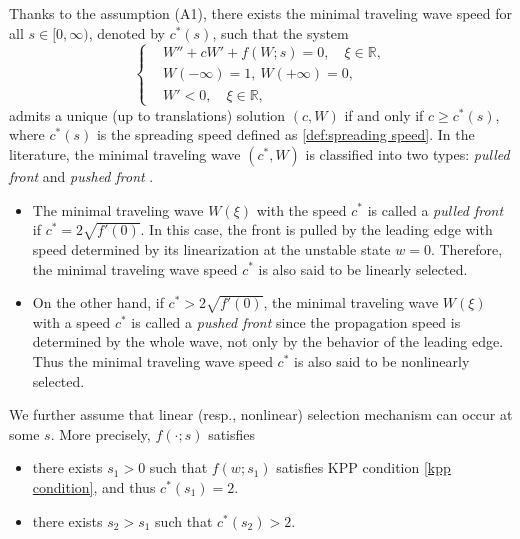 \documentclass[11pt,a4paper]{article}
\numberwithin{equation}{section}
\numberwithin{figure}{section}
\begin{document}
Thanks to the assumption  (A1), there exists the minimal traveling wave speed for all $s\in[0,\infty)$, denoted by $c^*(s)$, such that
the system
\begin{equation}\label{scalar tw-parameter s}
\left\{
\begin{aligned}
&W''+cW'+f(W;s)=0,\quad  \xi\in\mathbb{R},\\
&W(-\infty)=1,\ W(+\infty)=0,\\
&W'<0,\quad \xi\in\mathbb{R},
\end{aligned}
\right.
\end{equation}
admits a unique (up to translations) solution $(c,W)$ if and only if  $c\geq c^*(s)$, where $c^*(s)$ is the spreading speed defined as \eqref{def:spreading speed}. 
In the literature, the minimal traveling wave $(c^*,W)$ is classified into two types: {\em pulled front} and
{\em pushed front} \cite{Rothe1981,Stokes1976,van Saarloos2003}.
\begin{itemize}
    \item The minimal traveling wave $W(\xi)$ with the speed $c^*$ is called a {\em pulled front} if $c^*=2\sqrt{f'(0)}$.
In this case, the front is pulled by the leading edge with speed determined by its linearization at the unstable state $w=0$. Therefore, the minimal traveling wave speed $c^*$ is also said to be linearly selected. 
\item On the other hand, if $c^*>2\sqrt{f'(0)}$,
the minimal traveling wave $W(\xi)$ with a speed $c^*$ is called a {\em pushed front} since
the propagation speed is determined by the whole wave, not only by the behavior of the leading edge. Thus
the minimal traveling wave speed $c^*$ is also said to be nonlinearly selected.
\end{itemize}

We further assume that linear (resp., nonlinear) selection mechanism can occur at some $s$.
More precisely, $f(\cdot;s)$ satisfies %
\begin{itemize}
    \item[(A4)] there exists $s_1>0$ such that $f(w;s_1)$ satisfies KPP condition \eqref{kpp condition},
   and thus $c^*(s_1)=2$.
    \item[(A5)]  there exists  %
     $s_2>s_1$ such that $c^*(s_2)>2$.
\end{itemize}
\end{document}

